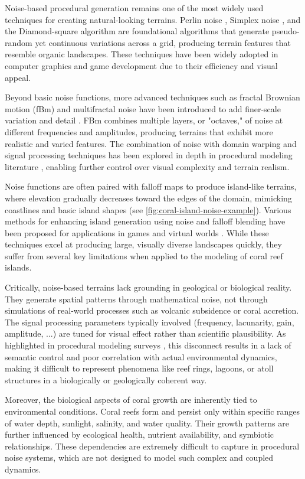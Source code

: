 Noise-based procedural generation remains one of the most widely used techniques for creating natural-looking terrains. Perlin noise \cite{Perlin1985}, Simplex noise \cite{Perlin2001}, and the Diamond-square algorithm \cite{Fournier1982} are foundational algorithms that generate pseudo-random yet continuous variations across a grid, producing terrain features that resemble organic landscapes. These techniques have been widely adopted in computer graphics and game development due to their efficiency and visual appeal.

Beyond basic noise functions, more advanced techniques such as fractal Brownian motion (fBm) and multifractal noise have been introduced to add finer-scale variation and detail \cite{Musgrave1989,Ebert2003}. FBm combines multiple layers, or "octaves," of noise at different frequencies and amplitudes, producing terrains that exhibit more realistic and varied features. The combination of noise with domain warping and signal processing techniques has been explored in depth in procedural modeling literature \cite{Reinhard2010}, enabling further control over visual complexity and terrain realism.

Noise functions are often paired with falloff maps to produce island-like terrains, where elevation gradually decreases toward the edges of the domain, mimicking coastlines and basic island shapes (see \cref{fig:coral-island-noise-example}). Various methods for enhancing island generation using noise and falloff blending have been proposed for applications in games and virtual worlds \cite{Olsen2004}. While these techniques excel at producing large, visually diverse landscapes quickly, they suffer from several key limitations when applied to the modeling of coral reef islands.

Critically, noise-based terrains lack grounding in geological or biological reality. They generate spatial patterns through mathematical noise, not through simulations of real-world processes such as volcanic subsidence or coral accretion. The signal processing parameters typically involved (frequency, lacunarity, gain, amplitude, ...) are tuned for visual effect rather than scientific plausibility. As highlighted in procedural modeling surveys \cite{Smelik2009,Galin2019}, this disconnect results in a lack of semantic control and poor correlation with actual environmental dynamics, making it difficult to represent phenomena like reef rings, lagoons, or atoll structures in a biologically or geologically coherent way.

Moreover, the biological aspects of coral growth are inherently tied to environmental conditions. Coral reefs form and persist only within specific ranges of water depth, sunlight, salinity, and water quality. Their growth patterns are further influenced by ecological health, nutrient availability, and symbiotic relationships. These dependencies are extremely difficult to capture in procedural noise systems, which are not designed to model such complex and coupled dynamics.

